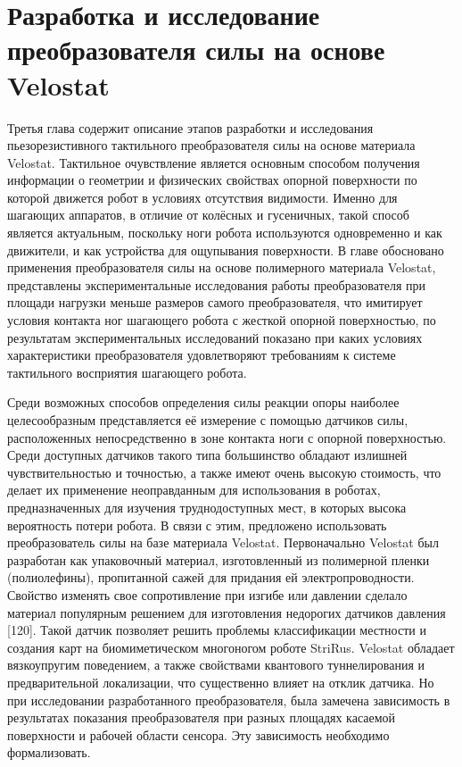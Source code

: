 \chapter{Разработка и исследование преобразователя силы на основе Velostat}\label{ch:ch3}

Третья глава содержит описание этапов разработки и исследования пьезорезистивного тактильного преобразователя силы на основе материала Velostat. Тактильное очувствление является основным способом получения информации о геометрии и физических свойствах опорной поверхности по которой движется робот в условиях отсутствия видимости. Именно для шагающих аппаратов, в отличие от колёсных и гусеничных, такой способ является актуальным, поскольку ноги робота используются одновременно и как движители, и как устройства для ощупывания поверхности. В главе обосновано применения преобразователя силы на основе полимерного материала Velostat, представлены экспериментальные исследования работы преобразователя при площади нагрузки меньше
размеров самого преобразователя, что имитирует условия контакта ног шагающего робота с жесткой опорной
поверхностью, по результатам экспериментальных исследований показано при каких условиях характеристики преобразователя удовлетворяют требованиям к системе тактильного восприятия шагающего робота.

Среди возможных способов определения силы реакции опоры наиболее целесообразным представляется её измерение с помощью датчиков силы, расположенных непосредственно в зоне контакта ноги с опорной поверхностью. Среди доступных датчиков такого типа большинство обладают излишней чувствительностью и точностью, а также имеют очень высокую стоимость, что делает их применение неоправданным для использования в роботах, предназначенных для изучения труднодоступных мест, в которых высока вероятность потери робота. В связи с этим, предложено использовать преобразователь силы на базе материала Velostat. Первоначально Velostat был разработан как упаковочный материал, изготовленный из полимерной пленки (полиолефины), пропитанной сажей для придания ей электропроводности. Свойство изменять свое сопротивление при изгибе или давлении сделало материал популярным решением для изготовления недорогих
датчиков давления [120]. Такой датчик позволяет решить проблемы классификации местности и создания карт на биомиметическом многоногом роботе StriRus. Velostat обладает вязкоупругим поведением, а также свойствами квантового туннелирования и предварительной локализации, что существенно влияет на отклик датчика. Но при исследовании разработанного преобразователя, была замечена зависимость в результатах показания преобразователя при разных площадях касаемой поверхности и рабочей области сенсора. Эту зависимость необходимо формализовать.

